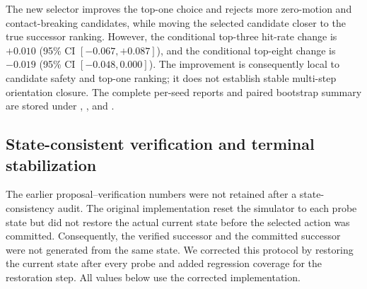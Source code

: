 \documentclass{article}
\begin{document}
\begin{table}[H]
\centering
\scriptsize
\setlength{\tabcolsep}{3pt}
\caption{Contact-only held-out closure ranking. Values are pooled over two
independent seeds and 256 ranking groups. The paired deltas compare the new
motion/contact selector with the existing feasibility head.}
\label{tab:supp-contact-mode-effective-motion}
\end{table}

The new selector improves the top-one choice and rejects more zero-motion and
contact-breaking candidates, while moving the selected candidate closer to the
true successor ranking. However, the conditional top-three hit-rate change is
$+0.010$ (95\% CI $[-0.067,+0.087]$), and the conditional top-eight change is
$-0.019$ (95\% CI $[-0.048,0.000]$). The improvement is consequently local to
candidate safety and top-one ranking; it does not establish stable
multi-step orientation closure. The complete per-seed reports and paired
bootstrap summary are stored under
,
,
and .

\subsection{State-consistent verification and terminal stabilization}
\label{sec:supp-verified-torque-closure}

The earlier proposal--verification numbers were not retained after a
state-consistency audit.  The original implementation reset the simulator to
each probe state but did not restore the actual current state before the
selected action was committed.  Consequently, the verified successor and the
committed successor were not generated from the same state.  We corrected this
protocol by restoring the current state after every probe and added regression
coverage for the restoration step.  All values below use the corrected
implementation.
\end{document}
